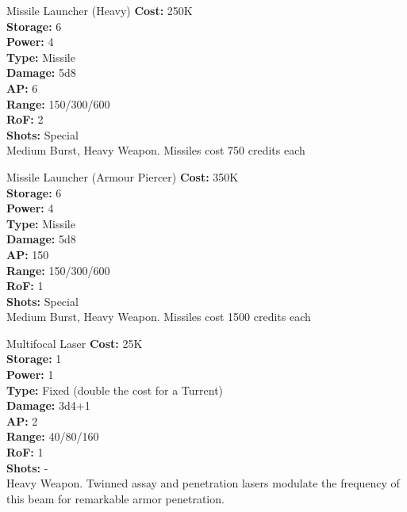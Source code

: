 \begin{multicols}{2}
\begin{genericsection}{Missile Launcher (Heavy)}
\textbf{Cost:} 250K\\
\textbf{Storage:} 6\\
\textbf{Power:} 4\\
\textbf{Type:} Missile\\
\textbf{Damage:} 5d8\\
\textbf{AP:} 6\\
\textbf{Range:} 150/300/600\\
\textbf{RoF:} 2\\
\textbf{Shots:} Special\\
Medium Burst, Heavy Weapon. Missiles cost 750 credits each
\end{genericsection}

\begin{genericsection}{Missile Launcher (Armour Piercer)}
\textbf{Cost:} 350K\\
\textbf{Storage:} 6\\
\textbf{Power:} 4\\
\textbf{Type:} Missile\\
\textbf{Damage:} 5d8\\
\textbf{AP:} 150\\
\textbf{Range:} 150/300/600\\
\textbf{RoF:} 1\\
\textbf{Shots:} Special\\
Medium Burst, Heavy Weapon. Missiles cost 1500 credits each
\end{genericsection}

\begin{genericsection}{Multifocal Laser}
\textbf{Cost:} 25K\\
\textbf{Storage:} 1\\
\textbf{Power:} 1\\
\textbf{Type:} Fixed (double the cost for a Turrent)\\
\textbf{Damage:} 3d4+1\\
\textbf{AP:} 2\\
\textbf{Range:} 40/80/160\\
\textbf{RoF:} 1\\
\textbf{Shots:} -\\
Heavy Weapon. Twinned assay and penetration lasers modulate the frequency of this beam for remarkable armor penetration.
\end{genericsection}


\end{multicols}
